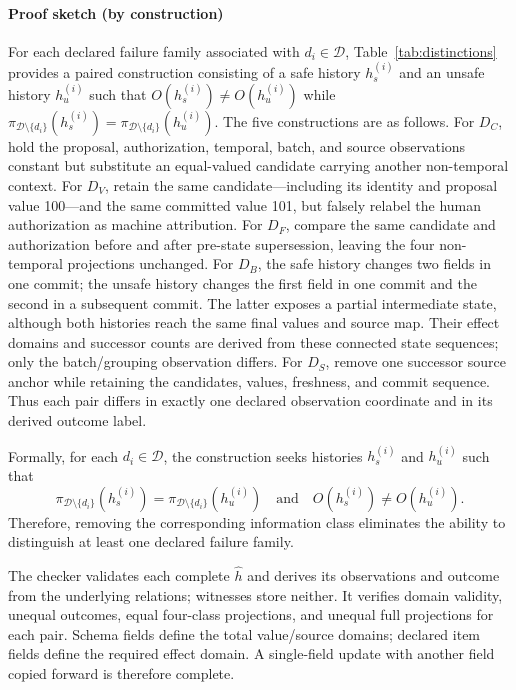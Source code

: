 \paragraph{Proof sketch (by construction)}
For each declared failure family associated with $d_i\in\mathcal D$, Table~\ref{tab:distinctions} provides a paired construction consisting of a safe history $h_s^{(i)}$ and an unsafe history $h_u^{(i)}$ such that
$O(h_s^{(i)})\neq O(h_u^{(i)})$ while
$\pi_{\mathcal D\setminus\{d_i\}}(h_s^{(i)})=\pi_{\mathcal D\setminus\{d_i\}}(h_u^{(i)})$.
The five constructions are as follows. For $D_C$, hold the proposal, authorization, temporal, batch, and source observations constant but substitute an equal-valued candidate carrying another non-temporal context. For $D_V$, retain the same candidate---including its identity and proposal value 100---and the same committed value 101, but falsely relabel the human authorization as machine attribution. For $D_F$, compare the same candidate and authorization before and after pre-state supersession, leaving the four non-temporal projections unchanged. For $D_B$, the safe history changes two fields in one commit; the unsafe history changes the first field in one commit and the second in a subsequent commit. The latter exposes a partial intermediate state, although both histories reach the same final values and source map. Their effect domains and successor counts are derived from these connected state sequences; only the batch/grouping observation differs. For $D_S$, remove one successor source anchor while retaining the candidates, values, freshness, and commit sequence. Thus each pair differs in exactly one declared observation coordinate and in its derived outcome label.

Formally, for each $d_i\in\mathcal D$, the construction seeks histories $h_s^{(i)}$ and $h_u^{(i)}$ such that
\begin{equation}
\pi_{\mathcal D\setminus\{d_i\}}(h_s^{(i)})
=
\pi_{\mathcal D\setminus\{d_i\}}(h_u^{(i)})
\quad\text{and}\quad
O(h_s^{(i)})\neq O(h_u^{(i)}).
\label{eq:irredundancy}
\end{equation}
Therefore, removing the corresponding information class eliminates the ability to distinguish at least one declared failure family.

The checker  validates each complete $\widehat h$ and derives its observations and outcome from the underlying relations; witnesses store neither. It verifies domain validity, unequal outcomes, equal four-class projections, and unequal full projections for each pair. Schema fields define the total value/source domains; declared item fields define the required effect domain. A single-field update with another field copied forward is therefore complete.

